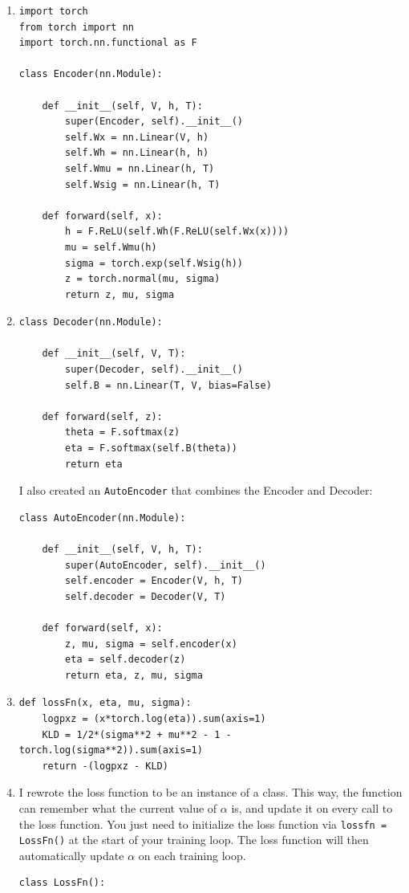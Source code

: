\documentclass{article}
\begin{document}
\begin{enumerate}
        \item
        \begin{verbatim}
import torch
from torch import nn
import torch.nn.functional as F

class Encoder(nn.Module):
    
    def __init__(self, V, h, T):
        super(Encoder, self).__init__()
        self.Wx = nn.Linear(V, h)
        self.Wh = nn.Linear(h, h)
        self.Wmu = nn.Linear(h, T)
        self.Wsig = nn.Linear(h, T)
        
    def forward(self, x):
        h = F.ReLU(self.Wh(F.ReLU(self.Wx(x))))
        mu = self.Wmu(h)
        sigma = torch.exp(self.Wsig(h))
        z = torch.normal(mu, sigma)
        return z, mu, sigma
        \end{verbatim}

        \item
        \begin{verbatim}
class Decoder(nn.Module):
    
    def __init__(self, V, T):
        super(Decoder, self).__init__()
        self.B = nn.Linear(T, V, bias=False)
        
    def forward(self, z):
        theta = F.softmax(z)
        eta = F.softmax(self.B(theta))
        return eta
        \end{verbatim}
        I also created an \texttt{AutoEncoder} that combines the Encoder and Decoder:
        \begin{verbatim}
class AutoEncoder(nn.Module):
    
    def __init__(self, V, h, T):
        super(AutoEncoder, self).__init__()
        self.encoder = Encoder(V, h, T)
        self.decoder = Decoder(V, T)
    
    def forward(self, x):
        z, mu, sigma = self.encoder(x)
        eta = self.decoder(z)
        return eta, z, mu, sigma
        \end{verbatim}

        \newpage
        \item
        \begin{verbatim}
def lossFn(x, eta, mu, sigma):
    logpxz = (x*torch.log(eta)).sum(axis=1)
    KLD = 1/2*(sigma**2 + mu**2 - 1 - torch.log(sigma**2)).sum(axis=1)
    return -(logpxz - KLD)
        \end{verbatim}

        \item I rewrote the loss function to be an instance of a class.
        This way, the function can remember what the current value of $\alpha$ is, and update it on every call to the loss function.
        You just need to initialize the loss function via \texttt{lossfn = LossFn()} at the start of your training loop.
        The loss function will then automatically update $\alpha$ on each training loop.
        \begin{verbatim}
class LossFn():
    

\end{verbatim}
\end{enumerate}
\end{document}
